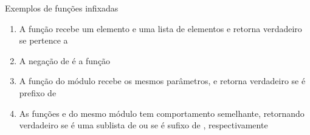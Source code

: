 \begin{frame}[fragile]{Exemplos de funções infixadas}

    \begin{enumerate}
        \item A função  recebe um elemento  e uma lista de 
            elementos  e retorna verdadeiro se  pertence a


        \item A negação de  é a função 


        \item A função  do módulo  recebe os
            mesmos parâmetros, e retorna verdadeiro se  é prefixo de 

        \item As funções  e  do mesmo módulo
            tem comportamento semelhante, retornando verdadeiro se  é uma sublista
            de  ou se  é sufixo de , 
            respectivamente
    \end{enumerate}

\end{frame}
